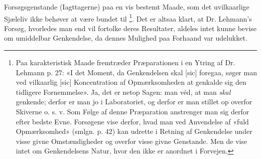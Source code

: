 \documentclass[12pt,a4paper,openany]{book}
\begin{document}
Forsøgsgenstande (Iagttagerne) paa en vis bestemt Maade, som det uvilkaarlige
Sjæleliv ikke behøver at være bundet til%
\footnote[1]{Paa karakteristisk Maade fremtræder Præparationen i en Ytring af
Dr. Lehmann p. 27: «I det Moment, da Genkendelsen skal [sic] foregaa, søger man
ved vilkaarlig [sic] Koncentration af Opmærksomheden at genkalde sig den
tidligere Fornemmelse». Ja, det er netop Sagen: man véd, at man \emph{skal}
genkende; derfor er man jo i Laboratoriet, og derfor er man stillet op overfor
Skiverne o. s. v. Som Følge af denne Præparation anstrenger man sig derfor
efter bedste Evne. Forsøgene vise derfor, hvad man ved Anvendelse af «fuld
Opmærksomhed» (smlgn. p. 42) kan udrette i Retning af Genkendelse under visse
givne Omstændigheder og overfor visse givne Genstande. Men de vise intet om
Genkendelsens Natur, hvor den ikke er anordnet i Forvejen.}. Det er altsaa
klart, at Dr. Lehmann's Forsøg, hvorledes man end vil fortolke deres
Resultater, aldeles intet kunne bevise om umiddelbar Genkendelse, da dennes
Mulighed paa Forhaand var udelukket.
\end{document}
